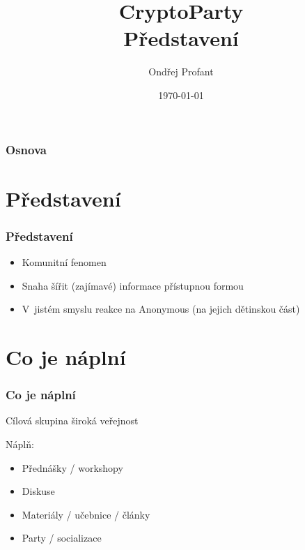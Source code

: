 \documentclass[xetex]{beamer}
\title{CryptoParty\\Představení}
\author{Ondřej Profant}
\institute[Piráti]{CryptoParty\\Česká pirátská strana}
\date{\today}
\begin{document}
\begin{frame}
  \titlepage
\end{frame}

\begin{frame}
  \frametitle{Osnova}
  \tableofcontents
\end{frame}	

\section{Představení}
\begin{frame}
 \frametitle{Představení}
	\begin{itemize}
		\item<2-4> Komunitní fenomen
		\item<3-4> Snaha šířit (zajímavé) informace přístupnou formou
		\item<4-4> V~jistém smyslu reakce na Anonymous (na jejich dětinskou část)
	\end{itemize}
\end{frame}


\section{Co je náplní}
\begin{frame}
 \frametitle{Co je náplní}
 
 \begin{block}{Cílová skupina}
 široká veřejnost
 \end{block}
 
 \bigskip
 
 Náplň:
 \begin{itemize} 
		\item<2-5> Přednášky / workshopy
		\item<3-5> Diskuse
		\item<4-5> Materiály / učebnice / články
		\item<5-5> Party / socializace
 \end{itemize}
\end{frame}
\end{document}
